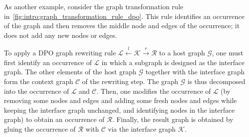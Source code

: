  As another example, consider the graph transformation rule in~\autoref{fig:intro:graph_transformation_rule_dpo}. This rule identifies an occurrence of the graph
 and then removes the middle node and edges of the occurrence; it does not add any new nodes or edges.
  \begin{figure}[H]
    \centering
    \caption{}
    \label{fig:intro:graph_transformation_rule_dpo}
\end{figure}

To apply a DPO graph rewriting rule $\mathcal{L} \overset{l}{\leftarrow} \mathcal{K} \overset{r}{\rightarrow} \mathcal{R}$ to a host graph $\mathcal{G}$, one must first identify an occurrence of $\mathcal{L}$ in which a subgraph is designed as the interface graph. The other elements of the host graph $\mathcal{G}$ together with the interface graph form the context graph $\mathcal{C}$ of the rewriting step.
The graph $\mathcal{G}$ is thus decomposed into the occurrence of $\mathcal{L}$ and $\mathcal{C}$. 
Then, one modifies the occurrence of $\mathcal{L}$ (by removing some nodes and edges and adding some fresh nodes and edges while keeping the interface graph unchanged, and identifying nodes in the interface graph)
to obtain an occurrence of $\mathcal{R}$. Finally, the result graph is obtained by gluing the occurrence of $\mathcal{R}$ with $\mathcal{C}$ via the interface graph $\mathcal{K}$.


